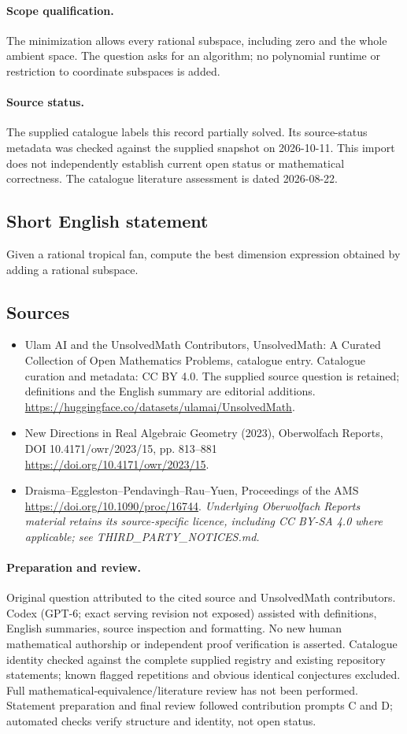 \documentclass[11pt]{article}
\begin{document}
\paragraph{Scope qualification.}
The minimization allows every rational subspace, including zero and the whole ambient space. The question asks for an algorithm; no polynomial runtime or restriction to coordinate subspaces is added.
\paragraph{Source status.}
The supplied catalogue labels this record partially solved. Its source-status metadata was checked against the supplied snapshot on 2026-10-11. This import does not independently establish current open status or mathematical correctness. The catalogue literature assessment is dated 2026-08-22.
\subsection{Short English statement}
Given a rational tropical fan, compute the best dimension expression obtained by adding a rational subspace.
\subsection{Sources}
\begin{itemize}
\item[S1] Ulam AI and the UnsolvedMath Contributors, UnsolvedMath: A Curated Collection of Open Mathematics Problems, catalogue entry. Catalogue curation and metadata: CC BY 4.0. The supplied source question is retained; definitions and the English summary are editorial additions.
\url{https://huggingface.co/datasets/ulamai/UnsolvedMath}.
\item[S2] New Directions in Real Algebraic Geometry (2023), Oberwolfach Reports, DOI 10.4171/owr/2023/15, pp. 813--881
\url{https://doi.org/10.4171/owr/2023/15}.
\item[S3] Draisma--Eggleston--Pendavingh--Rau--Yuen, Proceedings of the AMS
\url{https://doi.org/10.1090/proc/16744}.
\textit{Underlying Oberwolfach Reports material retains its source-specific licence, including CC BY-SA 4.0 where applicable; see THIRD\_PARTY\_NOTICES.md.}
\end{itemize}
\paragraph{Preparation and review.}
Original question attributed to the cited source and UnsolvedMath contributors. Codex (GPT-6; exact serving revision not exposed) assisted with definitions, English summaries, source inspection and formatting. No new human mathematical authorship or independent proof verification is asserted. Catalogue identity checked against the complete supplied registry and existing repository statements; known flagged repetitions and obvious identical conjectures excluded. Full mathematical-equivalence/literature review has not been performed. Statement preparation and final review followed contribution prompts C and D; automated checks verify structure and identity, not open status.
\label{end:statement}
\end{document}
